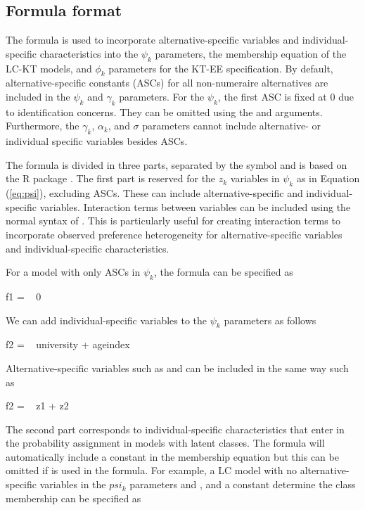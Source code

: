 \hypertarget{formula}{%
\subsection{Formula format}\label{formula}}

The formula is used to incorporate alternative-specific variables and
individual-specific characteristics into the \(\psi_k\) parameters, the
membership equation of the LC-KT models, and \(\phi_k\) parameters for
the KT-EE specification. By default, alternative-specific constants
(ASCs) for all non-numeraire alternatives are included in the \(\psi_k\)
and \(\gamma_k\) parameters. For the \(\psi_k\), the first ASC is fixed
at 0 due to identification concerns. They can be omitted using the
 and  arguments. Furthermore,
the \(\gamma_k\), \(\alpha_k\), and \(\sigma\) parameters cannot include
alternative- or individual specific variables besides ASCs.

The formula is divided in three parts, separated by the symbol \code{|}
and is based on the R package 
\citep{zeileisextended2010}. The first part is reserved for the \(z_k\)
variables in \(\psi_k\) as in Equation (\ref{eq:psi}), excluding ASCs.
These can include alternative-specific and individual-specific
variables. Interaction terms between variables can be included using the
normal  syntax of . This is particularly useful
for creating interaction terms to incorporate observed preference
heterogeneity for alternative-specific variables and individual-specific
characteristics.

For a model with only ASCs in \(\psi_k\), the formula can be specified
as

\begin{example}
f1 = ~ 0
\end{example}

We can add individual-specific variables to the \(\psi_k\) parameters as
follows

\begin{example}
f2 = ~ university + ageindex
\end{example}

Alternative-specific variables such as  and  can be
included in the same way such as

\begin{example}
f2 = ~ z1 + z2
\end{example}

The second part corresponds to individual-specific characteristics that
enter in the probability assignment in models with latent classes. The
formula will automatically include a constant in the membership equation
but this can be omitted if  is used in the formula. For
example, a LC model with no alternative-specific variables in the
\(psi_k\) parameters and ,  and a
constant determine the class membership can be specified as

